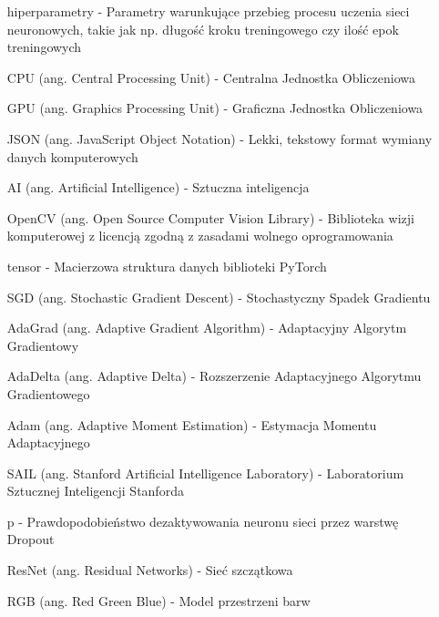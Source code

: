\begin{itemize}
    \item[hiperparametry] - Parametry warunkujące przebieg procesu uczenia sieci neuronowych,
    takie jak np. długość kroku treningowego czy ilość epok treningowych
    \item[CPU] (ang. Central Processing Unit) - Centralna Jednostka Obliczeniowa
    \item[GPU] (ang. Graphics Processing Unit) - Graficzna Jednostka Obliczeniowa
    \item[JSON] (ang. JavaScript Object Notation) - Lekki, tekstowy format wymiany danych komputerowych
    \item[AI] (ang. Artificial Intelligence) - Sztuczna inteligencja
    \item[OpenCV] (ang. Open Source Computer Vision Library) - Biblioteka wizji komputerowej z licencją zgodną z zasadami wolnego oprogramowania
    \item[tensor] - Macierzowa struktura danych biblioteki PyTorch
    \item[SGD] (ang. Stochastic Gradient Descent) - Stochastyczny Spadek Gradientu
    \item[AdaGrad] (ang. Adaptive Gradient Algorithm) - Adaptacyjny Algorytm Gradientowy
    \item[AdaDelta] (ang. Adaptive Delta) - Rozszerzenie Adaptacyjnego Algorytmu Gradientowego
    \item[Adam] (ang. Adaptive Moment Estimation) - Estymacja Momentu Adaptacyjnego
    \item[SAIL] (ang. Stanford Artificial Intelligence Laboratory) - Laboratorium Sztucznej Inteligencji Stanforda
    \item[p] - Prawdopodobieństwo dezaktywowania neuronu sieci przez warstwę Dropout
    \item[ResNet] (ang. Residual Networks) - Sieć szczątkowa
    \item[RGB] (ang. Red Green Blue) - Model przestrzeni barw


  \end{itemize}
